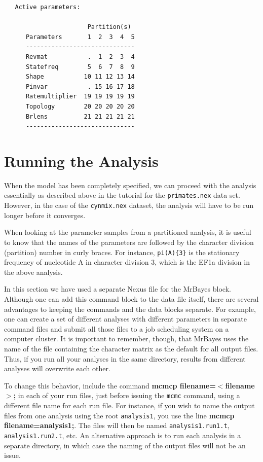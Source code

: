 \documentclass[12pt]{book}
\begin{document}
\begin{singlespacing}
\small
\begin{verbatim}
   Active parameters:
 
                       Partition(s)
      Parameters       1  2  3  4  5
      ------------------------------
      Revmat           .  1  2  3  4
      Statefreq        5  6  7  8  9
      Shape           10 11 12 13 14
      Pinvar           . 15 16 17 18
      Ratemultiplier  19 19 19 19 19
      Topology        20 20 20 20 20
      Brlens          21 21 21 21 21
      ------------------------------
\end{verbatim}
\normalsize
\end{singlespacing}

\section{Running the Analysis}

When the model has been completely specified, we can proceed with the analysis essentially as
described above in the tutorial for the \texttt{primates.nex} data set. However, in the case of the
\texttt{cynmix.nex} dataset, the analysis will have to be run longer before it converges.

When looking at the parameter samples from a partitioned analysis, it is useful to know that the
names of the parameters are followed by the character division (partition) number in curly braces.
For instance, \texttt{pi(A)\{3\}} is the stationary frequency of nucleotide A in character division
3, which is the EF1a division in the above analysis.

In this section we have used a separate Nexus file for the MrBayes block. Although one can add this
command block to the data file itself, there are several advantages to keeping the commands and the
data blocks separate. For example, one can create a set of different analyses with different
parameters in separate command files and submit all those files to a job scheduling system on a
computer cluster. It is important to remember, though, that MrBayes uses the name of the file
containing the character matrix as the default for all output files. Thus, if you run all your
analyses in the same directory, results from different analyses will overwrite each other.

To change this behavior, include the command \textbf{mcmcp filename=$<$filename$>$;} in each of
your run files, just before issuing the \texttt{mcmc} command, using a different file name for each
run file. For instance, if you wish to name the output files from one analysis using the root
\texttt{analysis1}, you use the line \textbf{mcmcp filename=analysis1;}. The files will then be
named \texttt{analysis1.run1.t}, \texttt{analysis1.run2.t}, etc. An alternative approach is to run
each analysis in a separate directory, in which case the naming of the output files will not be an
issue.
\end{document}
